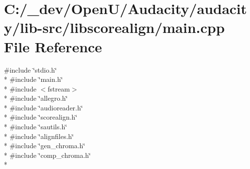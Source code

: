 \hypertarget{lib-src_2libscorealign_2main_8cpp}{}\section{C\+:/\+\_\+dev/\+Open\+U/\+Audacity/audacity/lib-\/src/libscorealign/main.cpp File Reference}
\label{lib-src_2libscorealign_2main_8cpp}
{\ttfamily \#include \char`\"{}stdio.\+h\char`\"{}}\\*
{\ttfamily \#include \char`\"{}main.\+h\char`\"{}}\\*
{\ttfamily \#include $<$fstream$>$}\\*
{\ttfamily \#include \char`\"{}allegro.\+h\char`\"{}}\\*
{\ttfamily \#include \char`\"{}audioreader.\+h\char`\"{}}\\*
{\ttfamily \#include \char`\"{}scorealign.\+h\char`\"{}}\\*
{\ttfamily \#include \char`\"{}sautils.\+h\char`\"{}}\\*
{\ttfamily \#include \char`\"{}alignfiles.\+h\char`\"{}}\\*
{\ttfamily \#include \char`\"{}gen\+\_\+chroma.\+h\char`\"{}}\\*
{\ttfamily \#include \char`\"{}comp\+\_\+chroma.\+h\char`\"{}}\\*
